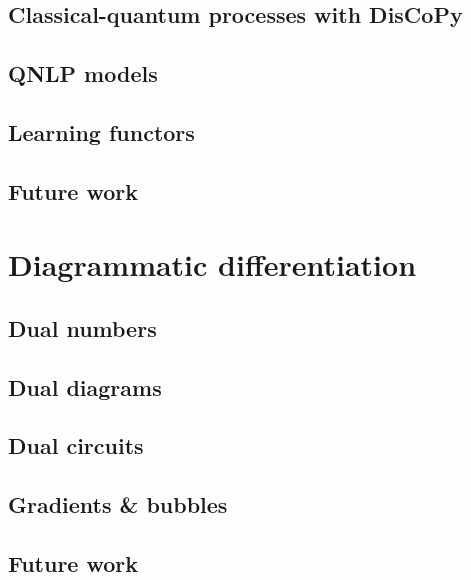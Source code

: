 \section{Classical-quantum processes with DisCoPy}
\section{QNLP models}
\section{Learning functors}
\section{Future work}

\chapter{Diagrammatic differentiation} \label{chapter-3:diag-diff}

\section{Dual numbers}
\section{Dual diagrams}
\section{Dual circuits}
\section{Gradients \& bubbles}
\section{Future work}

\setlength{\baselineskip}{0pt} %

{\renewcommand*\MakeUppercase[1]{#1}%
\printbibliography[heading=bibintoc,title=References]}


